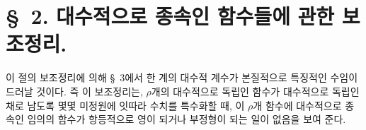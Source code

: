 
\section*{\S\ 2. 대수적으로 종속인 함수들에 관한 보조정리.}

이 절의 보조정리에 의해 \S\ 3에서 한 계의 대수적 계수가 본질적으로 특징적인 수임이 드러날 것이다. 즉 이 보조정리는, $\rho$개의 대수적으로 독립인 함수가 대수적으로 독립인 채로 남도록 몇몇 미정원에 잇따라 수치를 특수화할 때, 이 $\rho$개 함수에 대수적으로 종속인 임의의 함수가 항등적으로 영이 되거나 부정형이 되는 일이 없음을 보여 준다.

